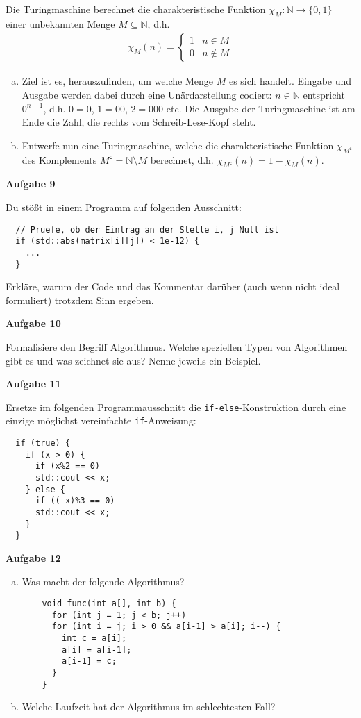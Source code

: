 \documentclass[a4paper,12pt,parskip=full]{scrartcl}
\newcommand{\Aufgabe}[1]{
  {
    \vspace*{0.5cm}
    \textsf{\textbf{Aufgabe #1}}
    \vspace*{0.2cm}
    
  }
}
\begin{document}
Die Turingmaschine berechnet die charakteristische Funktion
$\chi_M : \mathbb{N} \rightarrow \{0,1\}$ einer unbekannten Menge
$M \subseteq \mathbb{N}$, d.h.
\begin{align*}
  \chi_M(n) =
  \begin{cases}
    1 & n \in M \\
    0 & n \not\in M
  \end{cases}
\end{align*}
\begin{enumerate}[a)]
\item Ziel ist es, herauszufinden, um welche Menge $M$ es sich
  handelt. Eingabe und Ausgabe werden dabei durch eine Unärdarstellung
  codiert: $n \in \mathbb{N}$ entspricht $0^{n+1}$, d.h. $0 = 0$,
  $1 = 00$, $2=000$ etc. Die Ausgabe der Turingmaschine ist am Ende
  die Zahl, die rechts vom Schreib-Lese-Kopf steht.
\item Entwerfe nun eine Turingmaschine, welche die charakteristische
  Funktion $\chi_{M^{\mathsf{c}}}$ des Komplements
  $M^{\mathsf{c}} = \mathbb{N} \setminus M$ berechnet, d.h.
  $ \chi_{M^{\mathsf{c}}}(n) = 1 - \chi_M(n) $.
\end{enumerate}
\Aufgabe{9} Du stößt in einem Programm auf folgenden Ausschnitt:
\begin{lstlisting}
  // Pruefe, ob der Eintrag an der Stelle i, j Null ist
  if (std::abs(matrix[i][j]) < 1e-12) {
    ...
  }
\end{lstlisting}
Erkläre, warum der Code und das Kommentar darüber (auch wenn nicht
ideal formuliert) trotzdem Sinn ergeben.

\Aufgabe{10} Formalisiere den Begriff Algorithmus. Welche speziellen
Typen von Algorithmen gibt es und was zeichnet sie aus? Nenne jeweils
ein Beispiel.

\Aufgabe{11} Ersetze im folgenden Programmausschnitt die
\lstinline{if-else}-Konstruktion durch eine einzige möglichst
vereinfachte \lstinline{if}-Anweisung:
\begin{lstlisting}
  if (true) {
    if (x > 0) {
      if (x%2 == 0)
      std::cout << x;
    } else {
      if ((-x)%3 == 0)
      std::cout << x;
    }
  }
\end{lstlisting}

\Aufgabe{12}
\begin{enumerate}[a)]
\item Was macht der folgende Algorithmus?
  \begin{lstlisting}
    void func(int a[], int b) {
      for (int j = 1; j < b; j++)
      for (int i = j; i > 0 && a[i-1] > a[i]; i--) {
        int c = a[i];
        a[i] = a[i-1];
        a[i-1] = c;
      }
    }
  \end{lstlisting}
\item Welche Laufzeit hat der Algorithmus im schlechtesten Fall?
\end{enumerate}
\end{document}
